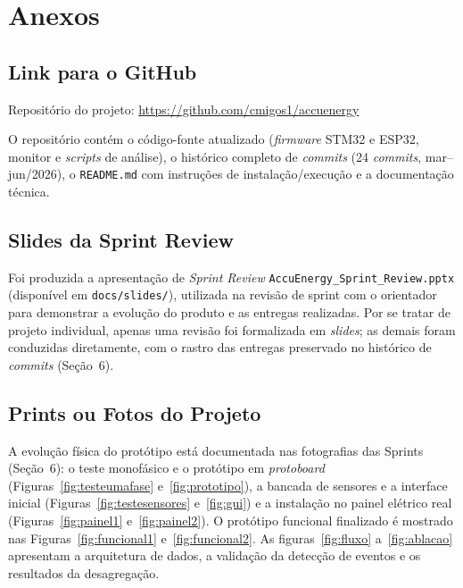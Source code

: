 \documentclass[12pt,a4paper]{article}
\begin{document}
\section{Anexos}

\subsection{Link para o GitHub}

Reposit\'orio do projeto: \url{https://github.com/cmigos1/accuenergy}

\noindent O reposit\'orio cont\'em o c\'odigo-fonte atualizado (\textit{firmware}
STM32 e ESP32, monitor e \textit{scripts} de an\'alise), o hist\'orico completo de
\textit{commits} (24 \textit{commits}, mar--jun/2026), o \texttt{README.md} com
instru\c{c}\~oes de instala\c{c}\~ao/execu\c{c}\~ao e a documenta\c{c}\~ao t\'ecnica.

\subsection{Slides da Sprint Review}

Foi produzida a apresenta\c{c}\~ao de \textit{Sprint Review}
\texttt{AccuEnergy\_Sprint\_Review.pptx} (dispon\'ivel em \texttt{docs/slides/}),
utilizada na revis\~ao de sprint com o orientador para demonstrar a evolu\c{c}\~ao
do produto e as entregas realizadas. Por se tratar de projeto individual, apenas
uma revis\~ao foi formalizada em \textit{slides}; as demais foram conduzidas
diretamente, com o rastro das entregas preservado no hist\'orico de
\textit{commits} (Se\c{c}\~ao~6).

\subsection{Prints ou Fotos do Projeto}

A evolu\c{c}\~ao f\'isica do prot\'otipo est\'a documentada nas fotografias das
Sprints (Se\c{c}\~ao~6): o teste monof\'asico e o prot\'otipo em \textit{protoboard}
(Figuras~\ref{fig:testeumafase} e~\ref{fig:prototipo}), a bancada de sensores e a
interface inicial (Figuras~\ref{fig:testesensores} e~\ref{fig:gui}) e a
instala\c{c}\~ao no painel el\'etrico real (Figuras~\ref{fig:painel1}
e~\ref{fig:painel2}). O prot\'otipo funcional finalizado \'e mostrado nas
Figuras~\ref{fig:funcional1} e~\ref{fig:funcional2}. As figuras~\ref{fig:fluxo}
a~\ref{fig:ablacao} apresentam a
arquitetura de dados, a valida\c{c}\~ao da detec\c{c}\~ao de eventos e os resultados
da desagrega\c{c}\~ao.
\end{document}

